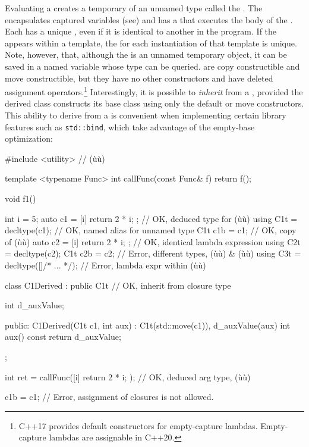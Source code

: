 Evaluating a  creates a temporary
 of an unnamed type called the . The  encapsulates captured variables (see\linebreak[4] 
) and has a  that
executes the body of the . Each  has a unique , even if it is identical
to another  in the program. If the
 appears within a template, the
 for each instantiation of that template is unique.
Note, however, that, although the  is an unnamed
temporary object, it can be saved in a named variable whose type can be
queried.  are copy constructible and move
constructible, but they have no other constructors and have deleted
assignment operators.{\cprotect\footnote{C++17 provides default
constructors for empty-capture lambdas. Empty-capture lambdas are
  assignable in C++20.}} Interestingly, it is possible to \emph{inherit}
from a , provided the derived class constructs its
 base class using only the default or move
constructors. This ability to derive from a  is
convenient when implementing certain library features such as
\lstinline!std::bind!, which take advantage of the empty-base optimization:

\begin{emcppslisting}
#include <utility>  // (ù{}ù)

template <typename Func>
int callFunc(const Func& f) { return f(); }

void f1()
{
    int   i   = 5;
    auto  c1  = [i]{ return 2 * i; };   // OK, deduced type for (ù{}ù)
    using C1t = decltype(c1);           // OK, named alias for unnamed type
    C1t   c1b = c1;                     // OK, copy of (ù{}ù)
    auto  c2  = [i]{ return 2 * i; };   // OK, identical lambda expression
    using C2t = decltype(c2);
    C1t   c2b = c2;                     // Error, different types, (ù{}ù) & (ù{}ù)
    using C3t = decltype([]{/* ... */});  // Error, lambda expr within (ù{}ù)

    class C1Derived : public C1t        // OK, inherit from closure type
    {
        int d_auxValue;

    public:
        C1Derived(C1t c1, int aux) : C1t(std::move(c1)), d_auxValue(aux) { }
        int aux() const { return d_auxValue; }
    };

    int ret = callFunc([i]{ return 2 * i; });  // OK, deduced arg type, (ù{}ù)

    c1b = c1;  // Error, assignment of closures is not allowed.
}
\end{emcppslisting}
    

